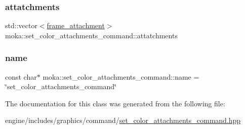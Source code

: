 \subsubsection{\texorpdfstring{attatchments}{attatchments}}
{\footnotesize\ttfamily std\+::vector$<$\mbox{\hyperlink{namespacemoka_a0a44ecbb877dec1107d9915dc95c58d1}{frame\+\_\+attachment}}$>$ moka\+::set\+\_\+color\+\_\+attachments\+\_\+command\+::attatchments}

\mbox{\label{classmoka_1_1set__color__attachments__command_a77905ca7babea5710cf12201b8549fd8}} 
\subsubsection{\texorpdfstring{name}{name}}
{\footnotesize\ttfamily const char$\ast$ moka\+::set\+\_\+color\+\_\+attachments\+\_\+command\+::name = \char`\"{}set\+\_\+color\+\_\+attachments\+\_\+command\char`\"{}}



The documentation for this class was generated from the following file\+:\begin{DoxyCompactItemize}
\item 
engine/includes/graphics/command/\mbox{\hyperlink{set__color__attachments__command_8hpp}{set\+\_\+color\+\_\+attachments\+\_\+command.\+hpp}}\end{DoxyCompactItemize}
